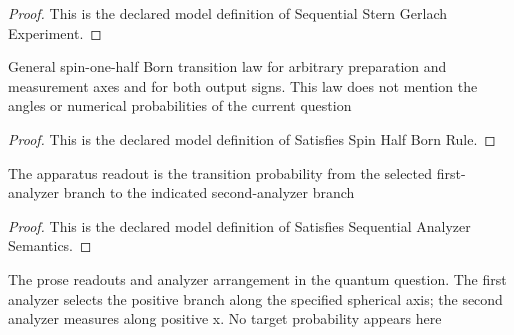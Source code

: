 \begin{proof}
  This is the declared model definition of Sequential Stern Gerlach Experiment.
\end{proof}
\begin{definition}
  \label{def:physics:phyx-mini-0541:phyxminiproblems-problemphyxmini0541-satisfiesspinhalfbornrule}
  General spin-one-half Born transition law for arbitrary preparation and measurement axes and for both output signs. This law does not mention the angles or numerical probabilities of the current question
\end{definition}
\begin{proof}
  This is the declared model definition of Satisfies Spin Half Born Rule.
\end{proof}
\begin{definition}
  \label{def:physics:phyx-mini-0541:phyxminiproblems-problemphyxmini0541-satisfiessequentialanalyzersemantics}
  The apparatus readout is the transition probability from the selected first-analyzer branch to the indicated second-analyzer branch
\end{definition}
\begin{proof}
  This is the declared model definition of Satisfies Sequential Analyzer Semantics.
\end{proof}
\begin{definition}
  \label{def:physics:phyx-mini-0541:phyxminiproblems-problemphyxmini0541-matchessterngerlachquestion}
  The prose readouts and analyzer arrangement in the quantum question. The first analyzer selects the positive branch along the specified spherical axis; the second analyzer measures along positive x. No target probability appears here
\end{definition}
